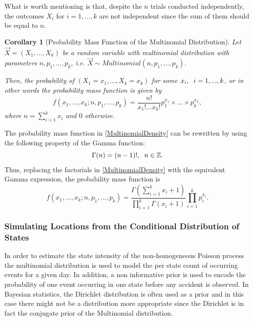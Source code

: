 \documentclass[12pt]{article}
\newtheorem{corollary}{Corollary}[theorem]
\theoremstyle{definition}
\begin{document}
What is worth mentioning is that, despite the $n$ trials conducted independently, the outcomes $X_i$ for $i=1,...,k$ are not independent since the sum of them should be equal to $n$. 

\begin{corollary}[Probability Mass Function of the Multinomial Distribution]
    Let $\Vec{X}=(X_1,...,X_k)$ be a random variable with multinomial distribution with parameters $n,p_1,...,p_k$, i.e. $\Vec{X}\sim Multinomial(n,p_1,...,p_k)$.

    Then, the probability of $(X_1=x_1,...,X_k=x_k)$ for some $x_i,\hspace{0.2cm} i=1,...,k$, or in other words the probability mass function is given by
    \begin{equation}\label{MultinomialDensity}
        f(x_1,...,x_k;n,p_1,...,p_k)
        =\frac{n!}{x_1!...x_k!}p_1^{x_1}\times...\times p_k^{x_k},
    \end{equation} where $n=\sum_{i=1}^k x_i$ and $0$ otherwise. 

\end{corollary}

The probability mass function in \eqref{MultinomialDensity} can be rewritten by using the following property of the Gamma function:
\begin{equation*}
    \Gamma(n)=(n-1)!,\hspace{0.2cm} n\in\mathbb{Z}.
\end{equation*} Thus, replacing the factorials in \eqref{MultinomialDensity} with the equivalent Gamma expression, the probability mass function is 
\begin{equation}
    f(x_1,...,x_k;n,p_1,...,p_k)=\frac{\Gamma(\sum_{i=1}^k x_i +1)}{\prod_{i=1}^k\Gamma(x_i+1)}\prod_{i=1}^k p_i^{x_i}.
\end{equation}

\subsubsection{Simulating Locations from the Conditional Distribution of States}
In order to estimate the state intensity of the non-homogeneous Poisson process the multinomial distribution is used to model the per state count of occurring events for a given day. In addition, a non informative prior is used to encode the probability of one event occurring in one state before any accident is observed. In Bayesian statistics, the Dirichlet distribution is often used as a prior and in this case there might not be a distribution more appropriate since the Dirichlet is in fact the conjugate prior of the Multinomial distribution. 
\end{document}

